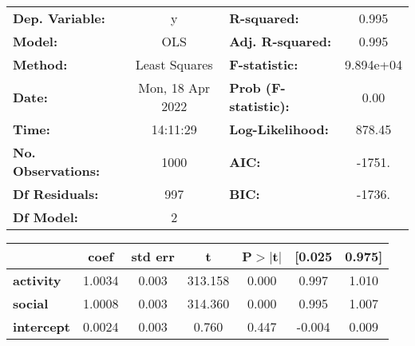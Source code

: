 \begin{center}
\begin{tabular}{lclc}
\toprule
\textbf{Dep. Variable:}    &        y         & \textbf{  R-squared:         } &     0.995   \\
\textbf{Model:}            &       OLS        & \textbf{  Adj. R-squared:    } &     0.995   \\
\textbf{Method:}           &  Least Squares   & \textbf{  F-statistic:       } & 9.894e+04   \\
\textbf{Date:}             & Mon, 18 Apr 2022 & \textbf{  Prob (F-statistic):} &     0.00    \\
\textbf{Time:}             &     14:11:29     & \textbf{  Log-Likelihood:    } &    878.45   \\
\textbf{No. Observations:} &        1000      & \textbf{  AIC:               } &    -1751.   \\
\textbf{Df Residuals:}     &         997      & \textbf{  BIC:               } &    -1736.   \\
\textbf{Df Model:}         &           2      & \textbf{                     } &             \\
\bottomrule
\end{tabular}
\begin{tabular}{lcccccc}
                   & \textbf{coef} & \textbf{std err} & \textbf{t} & \textbf{P$> |$t$|$} & \textbf{[0.025} & \textbf{0.975]}  \\
\midrule
\textbf{activity}  &       1.0034  &        0.003     &   313.158  &         0.000        &        0.997    &        1.010     \\
\textbf{social}    &       1.0008  &        0.003     &   314.360  &         0.000        &        0.995    &        1.007     \\
\textbf{intercept} &       0.0024  &        0.003     &     0.760  &         0.447        &       -0.004    &        0.009     \\
\bottomrule
\end{tabular}

\end{center}